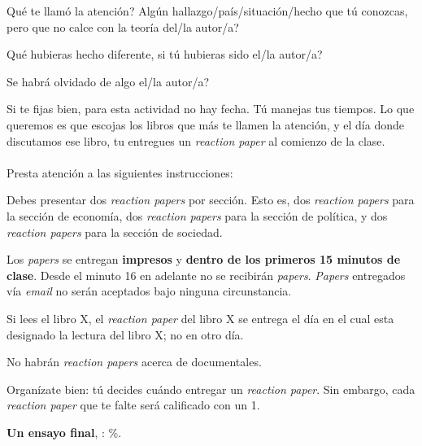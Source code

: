 \documentclass[letterpaper]{article}
\renewenvironment{itemize}{
  \begin{list}{}{
    \setlength{\leftmargin}{1.5em}
  }
}{
  \end{list}
}
\begin{document}
\begin{enumerate}
	\begin{itemize}
		\item[$\bullet$] Qu\'e te llam\'o la atenci\'on? Alg\'un hallazgo/pa\'is/situaci\'on/hecho que t\'u conozcas, pero que no calce con la teor\'ia del/la autor/a?
		\item[$\bullet$] Qu\'e hubieras hecho diferente, si t\'u hubieras sido el/la autor/a?
		\item[$\bullet$] Se habr\'a olvidado de algo el/la autor/a?
	\end{itemize}

	Si te fijas bien, para esta actividad no hay fecha. T\'u manejas tus tiempos. Lo que queremos es que escojas los libros que m\'as te llamen la atenci\'on, y el d\'ia donde discutamos ese libro, tu entregues un \emph{reaction paper} al comienzo de la clase. 
\\
\\
	Presta atenci\'on a las siguientes instrucciones:

	\begin{itemize}
		\item[$\bullet$] Debes presentar dos \emph{reaction papers} por secci\'on. Esto es, dos \emph{reaction papers} para la secci\'on de econom\'ia, dos \emph{reaction papers} para la secci\'on de pol\'itica, y dos \emph{reaction papers} para la secci\'on de sociedad.
		\item[$\bullet$] Los \emph{papers} se entregan {\bf impresos} y {\bf dentro de los primeros 15 minutos de clase}. Desde el minuto 16 en adelante no se recibir\'an \emph{papers}. \emph{Papers} entregados v\'ia \emph{email} no ser\'an aceptados bajo ninguna circunstancia.
		\item[$\bullet$] Si lees el libro X, el \emph{reaction paper} del libro X se entrega el d\'ia en el cual esta designado la lectura del libro X; no en otro d\'ia.
		\item[$\bullet$] No habr\'an \emph{reaction papers} acerca de documentales.
		\item[$\bullet$] Organ\'izate bien: t\'u decides cu\'ando entregar un \emph{reaction paper}. Sin embargo, cada \emph{reaction paper} que te falte ser\'a calificado con un 1.
	\end{itemize}


%

	\item {\bf Un ensayo final}, {\unskip}: {\unskip}\%.



\end{enumerate}
\end{document}

